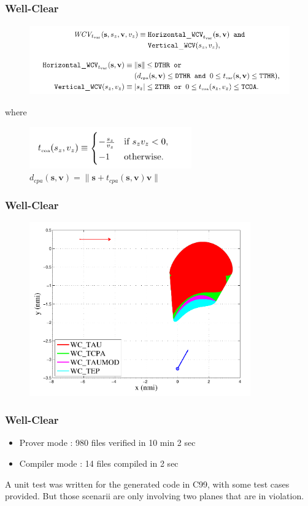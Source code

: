 \documentclass{beamer}
\begin{document}
\begin{frame}[fragile]
	\frametitle{Well-Clear}
	
	
	\begin{figure}
		\includegraphics[height=30mm]{images/WCV/wcv.pdf}\\
	\end{figure}
	where
	\begin{figure}
		\centering
		\includegraphics[height=18mm]{images/WCV/tcoa.pdf}\\
$d_{cpa} (\textbf{s},\textbf{v}) = \parallel \textbf{s} + t_{cpa}(\textbf{s}, \textbf{v})\textbf{v} \parallel$
	\end{figure}
	
\end{frame}

\begin{frame}[fragile]
	\frametitle{Well-Clear}
	
	
	\begin{figure}
		\includegraphics[height=75mm]{images/WCV/graph.pdf}\\
	\end{figure}
	
\end{frame}

\begin{frame}[fragile]
	\frametitle{Well-Clear}
	
	
	\begin{itemize}
		\item Prover mode : 980 files verified in 10 min 2 sec
		\item Compiler mode : 14 files compiled in 2 sec
	\end{itemize}
	
	A unit test was written for the generated code in C99, with some test cases provided. But those scenarii are only involving two planes that are in violation.
	
\end{frame}
\end{document}
